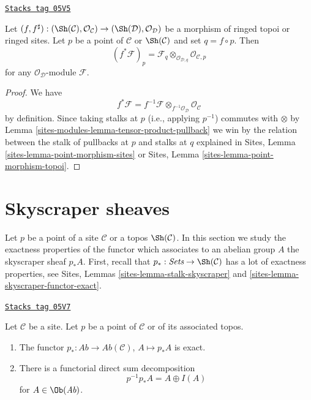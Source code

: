 \begin{lemma}
\label{sites-modules-lemma-pullback-stalk}
\href{https://stacks.math.columbia.edu/tag/05V5}{\texttt{Stacks tag 05V5}}

Let
$(f, f^\sharp) :
(\Sh(\mathcal{C}), \mathcal{O}_\mathcal{C})
\to
(\Sh(\mathcal{D}), \mathcal{O}_\mathcal{D})$
be a morphism of ringed topoi or ringed sites.
Let $p$ be a point of $\mathcal{C}$ or $\Sh(\mathcal{C})$
and set $q = f \circ p$. Then
$$
(f^*\mathcal{F})_p =
\mathcal{F}_q \otimes_{\mathcal{O}_{\mathcal{D}, q}}
\mathcal{O}_{\mathcal{C}, p}
$$
for any $\mathcal{O}_\mathcal{D}$-module $\mathcal{F}$.
\end{lemma}

\begin{proof}
We have
$$
f^*\mathcal{F} =
f^{-1}\mathcal{F} \otimes_{f^{-1}\mathcal{O}_\mathcal{D}}
\mathcal{O}_\mathcal{C}
$$
by definition. Since taking stalks at $p$ (i.e., applying
$p^{-1}$) commutes with $\otimes$ by
Lemma \ref{sites-modules-lemma-tensor-product-pullback}
we win by the relation between the stalk of pullbacks at $p$
and stalks at $q$ explained in
Sites, Lemma \ref{sites-lemma-point-morphism-sites} or
Sites, Lemma \ref{sites-lemma-point-morphism-topoi}.
\end{proof}

\section{Skyscraper sheaves}
\label{sites-modules-section-skyscraper}
Let $p$ be a point of a site $\mathcal{C}$ or a topos
$\Sh(\mathcal{C})$. In this section we study the exactness
properties of the functor which associates to an abelian group $A$
the skyscraper sheaf $p_*A$. First, recall that
$p_* : \textit{Sets} \to \Sh(\mathcal{C})$ has a lot
of exactness properties, see
Sites, Lemmas \ref{sites-lemma-stalk-skyscraper} and
\ref{sites-lemma-skyscraper-functor-exact}.

\begin{lemma}
\label{sites-modules-lemma-skyscraper-exact}
\href{https://stacks.math.columbia.edu/tag/05V7}{\texttt{Stacks tag 05V7}}

Let $\mathcal{C}$ be a site. Let $p$ be a point of
$\mathcal{C}$ or of its associated topos.
\begin{enumerate}
\item The functor $p_* : \textit{Ab} \to \textit{Ab}(\mathcal{C})$,
$A \mapsto p_*A$ is exact.
\item There is a functorial direct sum decomposition
$$
p^{-1}p_*A = A \oplus I(A)
$$
for $A \in \Ob(\textit{Ab})$.
\end{enumerate}
\end{lemma}

